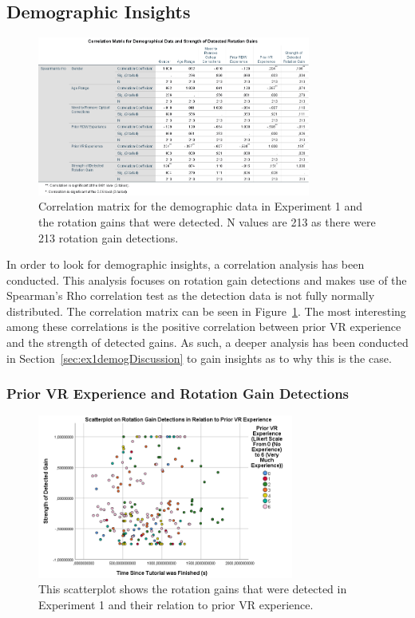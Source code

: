 \subsection{Demographic Insights}
\begin{figure}[tbph]
    \centering
    \includegraphics[width=0.8\textwidth]{figures/graphs/DemographicalCorrelationsEx1.png}
    \caption[Experiment 1 Demographic Correlation Matrix]{Correlation matrix for the demographic data in Experiment 1 and the rotation gains that were detected. N values are 213 as there were 213 rotation gain detections.}
    \label{fig:ex1demogcorrelationmatrix}
\end{figure}

In order to look for demographic insights, a correlation analysis has been conducted. This analysis focuses on rotation gain detections and makes use of the Spearman's Rho correlation test as the detection data is not fully normally distributed. The correlation matrix can be seen in Figure~\ref{fig:ex1demogcorrelationmatrix}. The most interesting among these correlations is the positive correlation between prior VR experience and the strength of detected gains. As such, a deeper analysis has been conducted in Section~\ref{sec:ex1demogDiscussion} to gain insights as to why this is the case. 

\subsubsection{Prior VR Experience and Rotation Gain Detections}
\begin{figure}[tbph]
    \centering
    \includegraphics[width=0.75\textwidth]{figures/graphs/PriorVRExperienceDetectionScatter.png}
    \caption[Scatterplot on Rotation Gain Detections in Relation to Prior VR Experience]{This scatterplot shows the rotation gains that were detected in Experiment 1 and their relation to prior VR experience.}
    \label{fig:rotationGainDetectionScatterVRExperience}
\end{figure}

